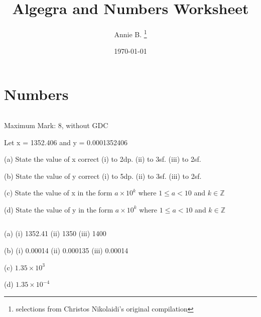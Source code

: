 \documentclass[12pt]{article}
\newenvironment{question}[2][Q]{\begin{trivlist}
\item[\hskip \labelsep {\bfseries #1}\hskip \labelsep {\bfseries #2.}]}{\end{trivlist}}
\newenvironment{answer}[2][A]{\begin{trivlist}
\item[\hskip \labelsep {\bfseries #1}\hskip \labelsep {\bfseries #2.}]}{\end{trivlist}}
\begin{document}
 
 
 
\title{Algegra and Numbers Worksheet}
\author{Annie B. \thanks{selections from Christos Nikolaidi's original compilation}}
\date{\today}
\maketitle

\section{Numbers}
\begin{question}{1} $ $\newline
  
  Maximum Mark: 8, without GDC\newline
  
  Let x = 1352.406 and y = 0.0001352406\newline
  
  (a) State the value of x correct
      (i)   to 2dp.
      (ii)  to 3sf.
      (iii) to 2sf.\newline
  
  (b) State the value of y correct
      (i)   to 5dp.
      (ii)  to 3sf.
      (iii) to 2sf.\newline
  
  (c) State the value of x in the form $a \times 10^{k}$  where $1 \leq a < 10$ and  $k \in \mathbb{Z}$\newline
  
  (d) State the value of y in the form $a \times 10^{k}$  where $1 \leq a < 10$ and  $k \in \mathbb{Z}$\newline
  
\end{question}

\begin{answer}{1} $ $\newline

  (a) (i) 1352.41 (ii) 1350 (iii) 1400\newline
  
  (b) (i) 0.00014 (ii) 0.000135 (iii) 0.00014\newline
  
  (c) $1.35 \times 10^{3}$\newline
  
  (d) $1.35 \times 10^{-4}$
  
\end{answer}
\end{document}
